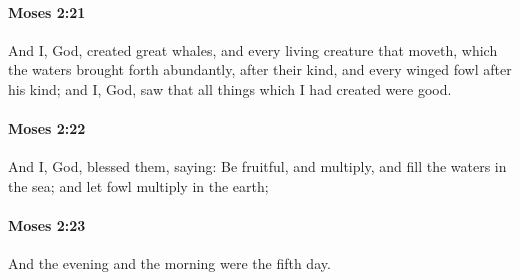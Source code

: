 		\paragraph{Moses 2:21} %
			\label{MOSES-2-21}

			And I, God, created great whales, and every living creature that moveth, which the waters brought forth abundantly, after their kind, and every winged fowl after his kind; and I, God, saw that all things which I had created were good.


		\paragraph{Moses 2:22} %
			\label{MOSES-2-22}

			And I, God, blessed them, saying: Be fruitful, and multiply, and fill the waters in the sea; and let fowl multiply in the earth;


		\paragraph{Moses 2:23} %
			\label{MOSES-2-23}

			And the evening and the morning were the fifth day.


